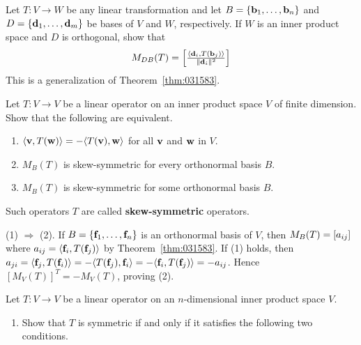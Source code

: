 \begin{multicols}{2}
\begin{ex}
Let $T : V \to W$ be any linear transformation and let $B = \{\textbf{b}_{1}, \dots, \textbf{b}_{n}\}$ and $D = \{\textbf{d}_{1}, \dots, \textbf{d}_{m}\}$ be bases of $V$ and $W$, respectively. If $W$ is an inner product space and $D$ is orthogonal, show that
\begin{equation*}
M_{DB}(T) = 
\left[ \tfrac{\langle \textbf{d}_i, T(\textbf{b}_j) \rangle}{\| \textbf{d}_i \| ^2} \right]
\end{equation*}
This is a generalization of Theorem~\ref{thm:031583}.
\end{ex}

\begin{ex}
Let $T : V \to V$ be a linear operator on an inner product space $V$ of finite dimension. Show that the following are equivalent.

\begin{enumerate}
\item $\langle\textbf{v}, T(\textbf{w}) \rangle  = -\langle T(\textbf{v}), \textbf{w} \rangle$ for all $\textbf{v}$ and $\textbf{w}$ in $V$.

\item $M_{B}(T)$ is skew-symmetric for every orthonormal basis $B$.

\item $M_{B}(T)$ is skew-symmetric for some orthonormal basis $B$.

\end{enumerate}

Such operators $T$ are called \textbf{skew-symmetric} operators.

\begin{sol}
(1) $\Rightarrow$ (2). If $B = \{\textbf{f}_1, \dots, \textbf{f}_n \}$ is an orthonormal basis
of $V$, then $M_B(T) = \left[ a_{ij}\right]$ where $a_{ij} = \langle \textbf{f}_i, T(\textbf{f}_j) \rangle$ by Theorem~\ref{thm:031583}. If (1) holds, then $ a_{ji} 
= \langle \textbf{f}_j, T(\textbf{f}_i) \rangle 
= -\langle T(\textbf{f}_j), \textbf{f}_i \rangle 
= -\langle \textbf{f}_i, T(\textbf{f}_j) \rangle 
= -a_{ij} $. Hence $[M_V(T)]^T = -M_V(T)$, proving (2).
\end{sol}
\end{ex}

\begin{ex}
Let $T : V \to V$ be a linear operator on an $n$-dimensional inner product space $V$.

\begin{enumerate}[label={\alph*.}]
\item Show that $T$ is symmetric if and only if it satisfies the following two conditions.


\end{enumerate}
\end{ex}
\end{multicols}
